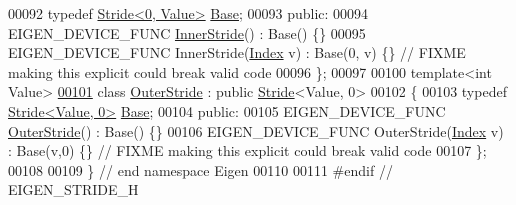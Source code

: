 \begin{DoxyCode}
00092     \textcolor{keyword}{typedef} \hyperlink{group___core___module}{Stride<0, Value>} \hyperlink{group___core___module}{Base};
00093   \textcolor{keyword}{public}:
00094     EIGEN\_DEVICE\_FUNC \hyperlink{class_eigen_1_1_inner_stride}{InnerStride}() : Base() \{\}
00095     EIGEN\_DEVICE\_FUNC InnerStride(\hyperlink{group___core___module_a96c2dfb0ce43fd8e19adcdf6094f5f63}{Index} v) : Base(0, v) \{\} \textcolor{comment}{// FIXME making this explicit could break
       valid code}
00096 \};
00097 
00100 \textcolor{keyword}{template}<\textcolor{keywordtype}{int} Value>
\hyperlink{class_eigen_1_1_outer_stride}{00101} \textcolor{keyword}{class }\hyperlink{class_eigen_1_1_outer_stride}{OuterStride} : \textcolor{keyword}{public} \hyperlink{group___core___module_class_eigen_1_1_stride}{Stride}<Value, 0>
00102 \{
00103     \textcolor{keyword}{typedef} \hyperlink{group___core___module}{Stride<Value, 0>} \hyperlink{group___core___module}{Base};
00104   \textcolor{keyword}{public}:
00105     EIGEN\_DEVICE\_FUNC \hyperlink{class_eigen_1_1_outer_stride}{OuterStride}() : Base() \{\}
00106     EIGEN\_DEVICE\_FUNC OuterStride(\hyperlink{group___core___module_a96c2dfb0ce43fd8e19adcdf6094f5f63}{Index} v) : Base(v,0) \{\} \textcolor{comment}{// FIXME making this explicit could break
       valid code}
00107 \};
00108 
00109 \} \textcolor{comment}{// end namespace Eigen}
00110 
00111 \textcolor{preprocessor}{#endif // EIGEN\_STRIDE\_H}
\end{DoxyCode}
